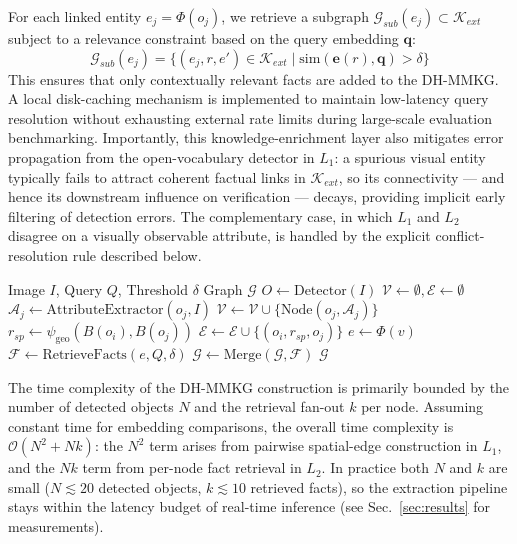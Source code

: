For each linked entity $e_j = \Phi(o_j)$, we retrieve a subgraph $\mathcal{G}_{sub}(e_j) \subset \mathcal{K}_{ext}$ subject to a relevance constraint based on the query embedding $\mathbf{q}$:
\begin{equation}
\mathcal{G}_{sub}(e_j) = \{ (e_j, r, e') \in \mathcal{K}_{ext} \mid \text{sim}(\mathbf{e}(r), \mathbf{q}) > \delta \}
\end{equation}
This ensures that only contextually relevant facts are added to the DH-MMKG. A local disk-caching mechanism is implemented to maintain low-latency query resolution without exhausting external rate limits during large-scale evaluation benchmarking. Importantly, this knowledge-enrichment layer also mitigates error propagation from the open-vocabulary detector in $L_1$: a spurious visual entity typically fails to attract coherent factual links in $\mathcal{K}_{ext}$, so its connectivity --- and hence its downstream influence on verification --- decays, providing implicit early filtering of detection errors. The complementary case, in which $L_1$ and $L_2$ disagree on a visually observable attribute, is handled by the explicit conflict-resolution rule described below.

\begin{algorithm}
\caption{DH-MMKG Construction Algorithm}
\label{alg:dh_mmkg}
\begin{algorithmic}[1]
\Require Image $I$, Query $Q$, Threshold $\delta$
\Ensure Graph $\mathcal{G}$
\State $O \leftarrow \text{Detector}(I)$
\State $\mathcal{V} \leftarrow \emptyset, \mathcal{E} \leftarrow \emptyset$
    \State $\mathcal{A}_j \leftarrow \text{AttributeExtractor}(o_j, I)$
    \State $\mathcal{V} \leftarrow \mathcal{V} \cup \{ \text{Node}(o_j, \mathcal{A}_j) \}$
\EndFor
{}
    \State $r_{sp} \leftarrow \psi_{\text{geo}}(B(o_i), B(o_j))$
    \State $\mathcal{E} \leftarrow \mathcal{E} \cup \{ (o_i, r_{sp}, o_j) \}$
\EndFor
{}
    \State $e \leftarrow \Phi(v)$
    \State $\mathcal{F} \leftarrow \text{RetrieveFacts}(e, Q, \delta)$
    \State $\mathcal{G} \leftarrow \text{Merge}(\mathcal{G}, \mathcal{F})$
\EndFor
\State \Return $\mathcal{G}$
\end{algorithmic}
\end{algorithm}

The time complexity of the DH-MMKG construction is primarily bounded by the number of detected objects $N$ and the retrieval fan-out $k$ per node. Assuming constant time for embedding comparisons, the overall time complexity is $\mathcal{O}(N^2 + N k)$: the $N^2$ term arises from pairwise spatial-edge construction in $L_1$, and the $N k$ term from per-node fact retrieval in $L_2$. In practice both $N$ and $k$ are small ($N \lesssim 20$ detected objects, $k \lesssim 10$ retrieved facts), so the extraction pipeline stays within the latency budget of real-time inference (see Sec.~\ref{sec:results} for measurements).

